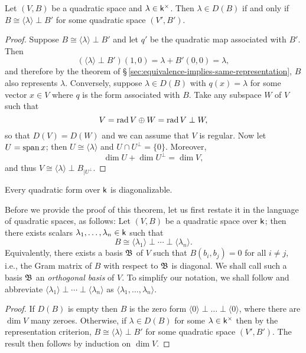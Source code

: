\begin{lemma}
    {\normalfont \cite[p.~9]{lam1973quadratic}} Let \((V, B)\) be a quadratic
    space and \(\lambda \in \mathsf{k}^{\times}\). Then \(\lambda \in D(B)\) if and
    only if \(B \cong \langle \lambda \rangle \perp B'\) for some quadratic
    space \((V', B')\).
\end{lemma}

\begin{proof}
  Suppose \(B \cong \langle \lambda \rangle \perp B'\) and let \(q'\) be the
  quadratic map associated with \(B'\). Then
  \[
    (\langle \lambda \rangle \perp B') (1, 0) = \lambda + B'(0,0) = \lambda,
  \]
  and therefore by the theorem of
  \S\,\ref{sec:equivalence-implies-same-representation}, \(B\) also represents
  \(\lambda\). Conversely, suppose \(\lambda \in D(B)\) with \(q(x) = \lambda\)
  for some vector \(x \in V\) where \(q\) is the form associated with \(B\).
  Take any subspace \(W\) of \(V\) such that
  \[
    V = \operatorname{rad} V \oplus W = \operatorname{rad} V \perp W,
  \]
  so that \(D(V) = D(W)\) and we can assume that \(V\) is regular. Now let \(U =
  \operatorname{span} x\); then \(U \cong \langle \lambda \rangle\) and \(U \cap U^{\perp} =
  \{0\}\). Moreover,
  \[
    \dim U + \dim U^{\perp} = \dim V,
  \]
  and thus \(V \cong \langle \lambda \rangle \perp B_{|U^{\perp}}\).
\end{proof}

\begin{theorem}
    Every quadratic form over \(\mathsf{k}\) is diagonalizable.
\end{theorem}

Before we provide the proof of this theorem, let us first restate it in the
language of quadratic spaces, as follows: Let \((V, B)\) be a quadratic space
over \(\mathsf{k}\); then there exists scalars \(\lambda_1, \dots, \lambda_n \in
\mathsf{k}\) such that
\[
  B \cong \langle \lambda_1 \rangle \perp \cdots \perp \langle \lambda_n \rangle.  
\]
Equivalently, there exists a basis \(\mathfrak{B}\) of \(V\) such that \(B(b_i, b_j) =
0\) for all \(i \neq j\), i.e., the Gram matrix of \(B\) with respect to
\(\mathfrak{B}\) is diagonal. We shall call such a basis \(\mathfrak{B}\) an
\emph{orthogonal basis} of \(V\). To simplify our notation, we shall follow
\cite{lam1973quadratic} and abbreviate \(\langle \lambda_1 \rangle \perp \cdots
\perp \langle \lambda_n \rangle\) as \(\langle \lambda_1, \dots, \lambda_n
\rangle\).\label{sec:lambda-class}

\smallskip

\begin{proof}
  If \(D(B)\) is empty then \(B\) is the zero form \(\langle 0 \rangle \perp
  \dots \perp \langle 0 \rangle\), where there are \(\dim V\) many zeroes.
  Otherwise, if \(\lambda \in D(B)\) for some \(\lambda \in \mathsf{k}^{\times}\)
  then by the representation criterion, \(B \cong \langle \lambda \rangle \perp
  B'\) for some quadratic space \((V', B')\). The result then follows by
  induction on \(\dim V\).
\end{proof}

